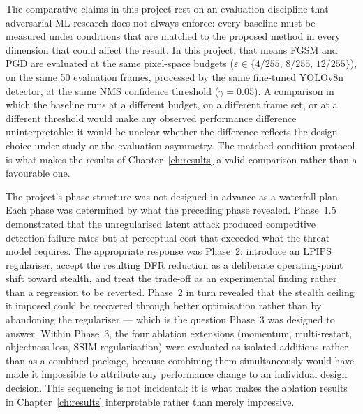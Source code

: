 \documentclass[12pt,a4paper]{report}
\begin{document}
The comparative claims in this project rest on an evaluation
discipline that adversarial ML research does not always enforce:
every baseline must be measured under conditions that are matched
to the proposed method in every dimension that could affect the
result. In this project, that means FGSM and PGD are evaluated
at the same pixel-space budgets
($\varepsilon \in \{4/255,\,8/255,\,12/255\}$), on the same
50 evaluation frames, processed by the same fine-tuned YOLOv8n
detector, at the same NMS confidence threshold ($\gamma = 0.05$).
A comparison in which the baseline runs at a different budget,
on a different frame set, or at a different threshold would make
any observed performance difference uninterpretable: it would be
unclear whether the difference reflects the design choice under
study or the evaluation asymmetry. The matched-condition protocol
is what makes the results of Chapter~\ref{ch:results} a valid
comparison rather than a favourable one.

The project's phase structure was not designed in advance as a
waterfall plan. Each phase was determined by what the preceding
phase revealed. Phase~1.5 demonstrated that the unregularised
latent attack produced competitive detection failure rates but at
perceptual cost that exceeded what the threat model requires.
The appropriate response was Phase~2: introduce an LPIPS
regulariser, accept the resulting DFR reduction as a deliberate
operating-point shift toward stealth, and treat the trade-off
as an experimental finding rather than a regression to be
reverted. Phase~2 in turn revealed that the stealth ceiling it
imposed could be recovered through better optimisation rather
than by abandoning the regulariser --- which is the question
Phase~3 was designed to answer. Within Phase~3, the four
ablation extensions (momentum, multi-restart, objectness loss,
SSIM regularisation) were evaluated as isolated additions rather
than as a combined package, because combining them simultaneously
would have made it impossible to attribute any performance change
to an individual design decision. This sequencing is not
incidental: it is what makes the ablation results in
Chapter~\ref{ch:results} interpretable rather than merely
impressive.
\end{document}
